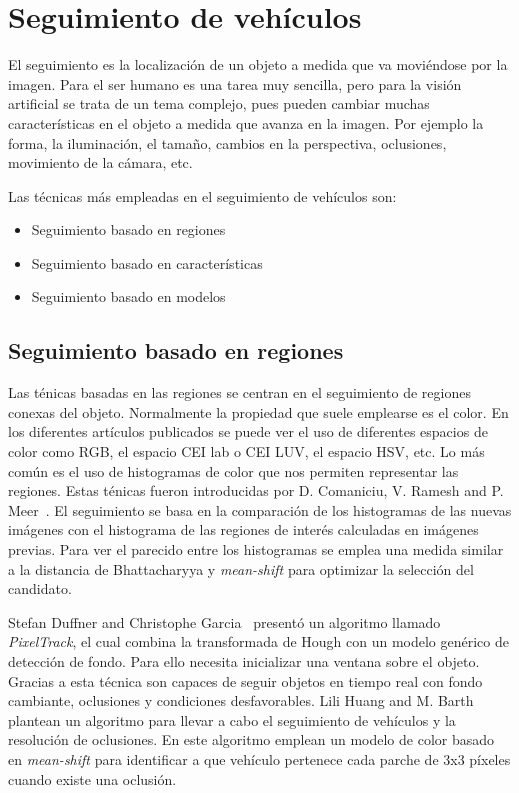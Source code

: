 \section{Seguimiento de vehículos}

El seguimiento es la localización de un objeto a medida que va moviéndose por la imagen. Para el ser humano es una tarea muy sencilla, pero para la visión artificial se trata de un tema complejo, pues pueden cambiar muchas características en el objeto  a medida que avanza en la imagen. Por ejemplo la forma, la iluminación, el tamaño, cambios en la perspectiva, oclusiones, movimiento de la cámara, etc.

Las técnicas más empleadas en el seguimiento de vehículos son:

\begin{itemize}
    \item Seguimiento basado en regiones
    \item Seguimiento basado en características
    \item Seguimiento basado en modelos
\end{itemize}

\subsection{Seguimiento basado en regiones}

Las ténicas basadas en las regiones se centran en el seguimiento de regiones conexas del objeto. Normalmente la propiedad que suele emplearse es el color. En los diferentes artículos publicados se puede ver el uso de diferentes espacios de color como RGB, el espacio CEI lab o CEI LUV, el espacio HSV, etc. Lo más común es el uso de histogramas de color que nos permiten representar las regiones. Estas ténicas fueron introducidas por D. Comaniciu, V. Ramesh and P. Meer~\cite{kernel_based_object}. El seguimiento se basa en la comparación de los histogramas de las nuevas imágenes con el histograma de las regiones de interés calculadas en imágenes previas. Para ver el parecido entre los histogramas se emplea una medida similar a la distancia de Bhattacharyya y \textit{mean-shift} para optimizar la selección del candidato.

Stefan Duffner and Christophe Garcia~\cite{pixeltrack} presentó un algoritmo llamado \textit{PixelTrack}, el cual combina la transformada de Hough con un modelo genérico de detección de fondo. Para ello necesita inicializar una ventana sobre el objeto. Gracias a esta técnica son capaces de seguir objetos en tiempo real con fondo cambiante, oclusiones y condiciones desfavorables.
Lili Huang and M. Barth~\cite{real_time_vehicle} plantean un algoritmo para llevar a cabo el seguimiento de vehículos y la resolución de oclusiones. En este algoritmo emplean un modelo de color basado en \textit{mean-shift} para identificar a que vehículo pertenece cada parche de 3x3 píxeles cuando existe una oclusión.

